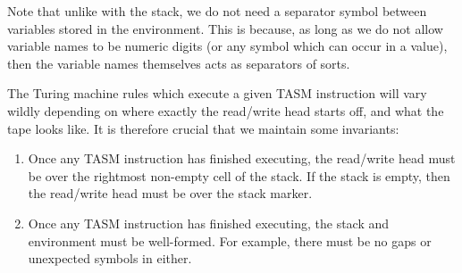 \begin{center}
\end{center}

Note that unlike with the stack, we do not need a separator symbol between variables stored in the environment. This is because, as long as we do not allow variable names to be numeric digits (or any symbol which can occur in a value), then the variable names themselves acts as separators of sorts.

The Turing machine rules which execute a given TASM instruction will vary wildly depending on where exactly the read/write head starts off, and what the tape looks like. It is therefore crucial that we maintain some invariants:

\begin{enumerate}
    \item Once any TASM instruction has finished executing, the read/write head must be over the rightmost non-empty cell of the stack. If the stack is empty, then the read/write head must be over the stack marker.
    \item Once any TASM instruction has finished executing, the stack and environment must be well-formed. For example, there must be no gaps or unexpected symbols in either.
\end{enumerate}

